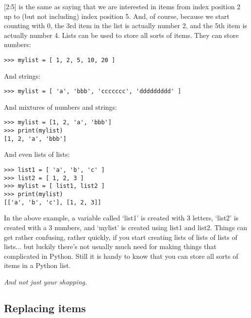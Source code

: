 [2:5] is the same as saying that we are interested in items from index position 2 up to (but not including) index position 5.  And, of course, because we start counting with 0, the 3rd item in the list is actually number 2, and the 5th item is actually number 4. Lists can be used to store all sorts of items.  They can store numbers:

\begin{listing}
\begin{verbatim}
>>> mylist = [ 1, 2, 5, 10, 20 ]
\end{verbatim}
\end{listing}

\noindent
And strings:

\begin{listing}
\begin{verbatim}
>>> mylist = [ 'a', 'bbb', 'ccccccc', 'ddddddddd' ]
\end{verbatim}
\end{listing}

\noindent
And mixtures of numbers and strings:

\begin{listing}
\begin{verbatim}
>>> mylist = [1, 2, 'a', 'bbb']
>>> print(mylist)
[1, 2, 'a', 'bbb']
\end{verbatim}
\end{listing}

\noindent
And even lists of lists:

\begin{listing}
\begin{verbatim}
>>> list1 = [ 'a', 'b', 'c' ]
>>> list2 = [ 1, 2, 3 ]
>>> mylist = [ list1, list2 ]
>>> print(mylist)
[['a', 'b', 'c'], [1, 2, 3]]
\end{verbatim}
\end{listing}

In the above example, a variable called `list1' is created with 3 letters, `list2' is created with a 3 numbers, and `mylist' is created using list1 and list2. Things can get rather confusing, rather quickly, if you start creating lists of lists of lists of lists$\ldots$ but luckily there's not usually much need for making things that complicated in Python. Still it is handy to know that you can store all sorts of items in a Python list.

\noindent
\emph{And not just your shopping.}

\subsection*{\color{BrickRed}Replacing items}

